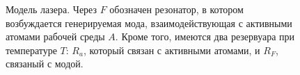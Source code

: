 \begin{figure}
\centering



\caption{Модель лазера. Через $F$ обозначен резонатор, в котором возбуждается генерируемая мода,
взаимодействующая с активными атомами рабочей среды $A$. Кроме того, имеются два
резервуара при температуре $T$: $R_{a}$, который связан с
активными атомами, и $R_{F}$, связаный с модой.}
\label{figPart2Laser2_2}
\end{figure}
